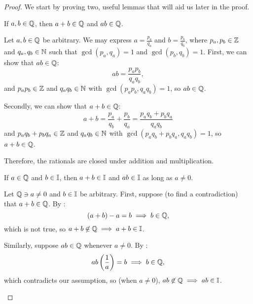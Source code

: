 \begin{proof}
  We start by proving two, useful lemmas that will aid us later in the proof.

    \begin{lemma}\label{lem:rationals-closed-under-addition-multiplication}
      If $a, b \in \mathbb{Q}$, then $a + b \in \mathbb{Q}$ and $ab \in \mathbb{Q}$.
    \end{lemma}

      \begin{subproof}
        Let $a, b \in \mathbb{Q}$ be arbitrary. We may express $a = \frac{p_{a}}{q_{a}}$ and $b = \frac{p_{b}}{q_{b}}$, 
        where $p_{a}, p_{b} \in \mathbb{Z}$ and $q_{a}, q_{b} \in \mathbb{N}$ such that $\gcd(p_{a}, q_{a}) = 1$ and $\gcd(p_{b}, q_{b}) = 1$.
        First, we can show that $ab \in \mathbb{Q}$:
        \[
          ab = \frac{p_{a}p_{b}}{q_{a}q_{b}},
        \]
        and $p_{a}p_{b} \in \mathbb{Z}$ and $q_{a}q_{b} \in \mathbb{N}$ with $\gcd(p_{a}p_{b}, q_{a}q_{b}) = 1$, so $ab \in \mathbb{Q}$.

        Secondly, we can show that $a + b \in \mathbb{Q}$:
        \[
          a + b = \frac{p_{a}}{q_{b}} + \frac{p_{b}}{q_{a}} = \frac{p_{a}q_{b} + p_{b}q_{a}}{q_{a}q_{b}}
        \]
        and $p_{a}q_{b} + p_{b}q_{a} \in \mathbb{Z}$ and $q_{a}q_{b} \in \mathbb{N}$ with 
        $\gcd(p_{a}q_{b} + p_{b}q_{a}, q_{a}q_{b}) = 1$, so $a + b \in \mathbb{Q}$.

        Therefore, the rationals are closed under addition and multiplication. 
      \end{subproof}

    \begin{lemma}\label{lem:rational-irrational-addition-multiplication}
      If $a \in \mathbb{Q}$ and $b \in \mathbb{I}$\footnotemark{}, then $a + b \in \mathbb{I}$ and $ab \in \mathbb{I}$ as long as $a \neq 0$.
    \end{lemma}

    \begin{subproof}
      Let $\mathbb{Q} \ni a \neq 0$ and $b \in \mathbb{I}$ be arbitrary. 
      First, suppose (to find a contradiction) that $a + b \in \mathbb{Q}$. By :
      \[
        (a + b) - a = b \implies b \in \mathbb{Q},
      \]
      which is not true, so $a + b \not\in \mathbb{Q} \implies a + b \in \mathbb{I}$.

      Similarly, suppose $ab \in \mathbb{Q}$ whenever $a \neq 0$. By :
      \[
        ab \left( \frac{1}{a} \right) = b \implies b \in \mathbb{Q},
      \]
      which contradicts our assumption, so (when $a \neq 0$), $ab \not\in \mathbb{Q} \implies ab \in \mathbb{I}$.
    \end{subproof}


\end{proof}
